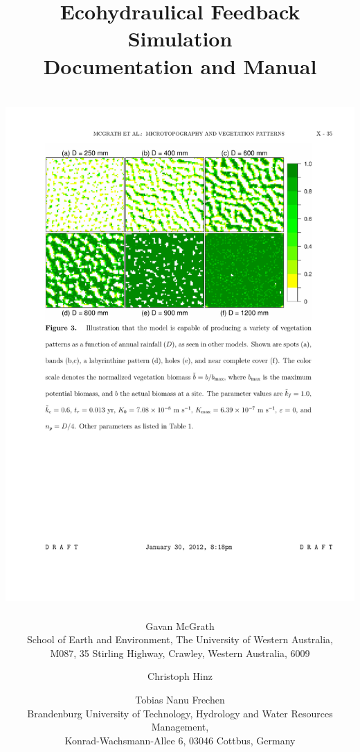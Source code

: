 \documentclass[twoside,english]{article}
\begin{document}
\fancyheadoffset[LE,RO]{25pt}
\setlength{\headheight}{13pt}
\fancyhead[RO,RE,LE,LO]{}
\fancyhead[RO,LE]{\slshape \rightmark}
\fancyhead[RE,LO]{\slshape \leftmark}
\renewcommand{\headrulewidth}{0pt}




\title{\textbf{\huge Ecohydraulical Feedback Simulation}\\
\textbf{\huge Documentation and Manual}\\
\textbf{\huge \bigskip{}}\\
\textbf{\huge \includegraphics{figures/band_simulation.pdf}}}

\author{Gavan McGrath\\
School of Earth and Environment, The University of Western Australia,\\
M087, 35 Stirling Highway, Crawley, Western Australia, 6009 \and
Christoph Hinz \and Tobias Nanu Frechen\\
Brandenburg University of Technology, Hydrology and Water Resources
Management, \\
Konrad-Wachsmann-Allee 6, 03046 Cottbus, Germany}
\end{document}

